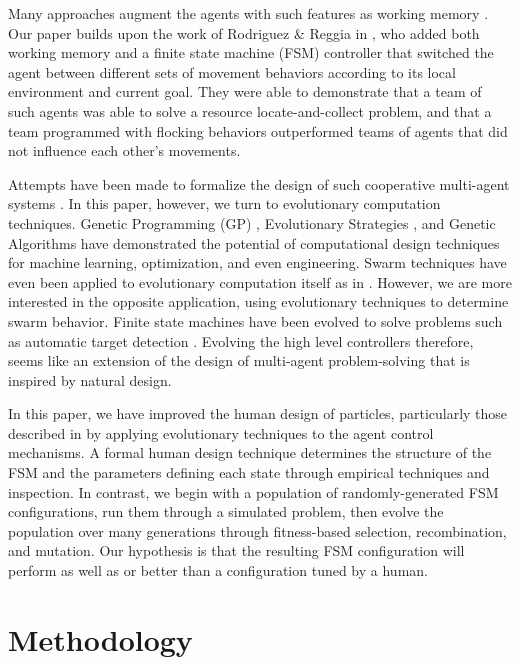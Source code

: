 \documentclass[12pt,journal,compsoc]{IEEEtran}
\begin{document}
Many approaches augment the agents with such features as working memory \cite{winder2012role,hu2003particle}. Our paper builds upon the work of Rodriguez \& Reggia in \cite{rodriguez2004extending}, who added both working memory and a finite state machine (FSM) controller that switched the agent between different sets of movement behaviors according to its local environment and current goal. They were able to demonstrate that a team of such agents was able to solve a resource locate-and-collect problem, and that a team programmed with flocking behaviors outperformed teams of agents that did not influence each other's movements.

Attempts have been made to formalize the design of such cooperative multi-agent systems \cite{mataric1993designing,capera2003amas}. In this paper, however, we turn to evolutionary computation techniques. Genetic Programming (GP) \cite{koza1992genetic}, Evolutionary Strategies \cite{rechenberg1989evolution}, and Genetic Algorithms \cite{goldberg1988genetic} have demonstrated the potential of computational design techniques for machine learning, optimization, and even engineering. Swarm techniques have even been applied to evolutionary computation itself as in  \cite{wei2002swarm,miranda2005evolutionary}. However, we are more interested in the opposite application, using evolutionary techniques to determine swarm behavior. Finite state machines have been evolved to solve problems such as automatic target detection \cite{benson2000evolving}. Evolving the high level controllers therefore, seems like an extension of the design of multi-agent problem-solving that is inspired by natural design.

In this paper, we have improved the human design of particles, particularly those described in \cite{rodriguez2004extending} by applying evolutionary techniques to the agent control mechanisms. A formal human design technique determines the structure of the FSM and the parameters defining each state through empirical techniques and inspection. In contrast, we begin with a population of randomly-generated FSM configurations, run them through a simulated problem, then evolve the population over many generations through fitness-based selection, recombination, and mutation. Our hypothesis is that the resulting FSM configuration will perform as well as or better than a configuration tuned by a human.

\section{Methodology}
\end{document}
